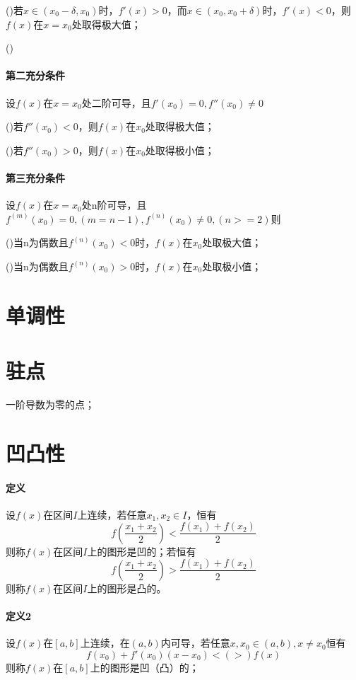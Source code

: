 ()若\(x \in (x_0 - \delta, x_0)\)时，\(f'(x) > 0\)，而\(x \in (x_0, x_0 + \delta)\)时，\(f'(x) < 0\)，则\(f(x)\)在\(x = x_0\)处取得极大值；

()

\paragraph{第二充分条件}
设\(f(x)\)在\(x = x_0\)处二阶可导，且\(f'(x_0) = 0, f''(x_0) \neq 0\)

()若\(f''(x_0) < 0\)，则\(f(x)\)在\(x_0\)处取得极大值；

()若\(f''(x_0) > 0\)，则\(f(x)\)在\(x_0\)处取得极小值；

\paragraph{第三充分条件}
设\(f(x)\)在\(x = x_0\)处n阶可导，且\(f^{(m)}(x_0) = 0, (m = n - 1), f^{(n)}(x_0) \neq 0, (n >= 2)\)则

()当n为偶数且\(f^{(n)}(x_0) < 0\)时，\(f(x)\)在\(x_0\)处取极大值；

()当n为偶数且\(f^{(n)}(x_0) > 0\)时，\(f(x)\)在\(x_0\)处取极小值；


\section{单调性}

\section{驻点}
一阶导数为零的点；


\section{凹凸性}
\paragraph{定义}
设\(f(x)\)在区间\(I\)上连续，若任意\(x_1, x_2 \in I\)，恒有\[f(\dfrac{x_1 + x_2}{2}) < \dfrac{f(x_1) + f(x_2)}{2}\]则称\(f(x)\)在区间\(I\)上的图形是凹的；若恒有
\[f(\dfrac{x_1 + x_2}{2}) > \dfrac{f(x_1) + f(x_2)}{2}\]
则称\(f(x)\)在区间\(I\)上的图形是凸的。

\paragraph{定义2}
设\(f(x)\)在\([a, b]\)上连续，在\((a, b)\)内可导，若任意\(x, x_0 \in (a, b), x \neq x_0\)恒有\[f(x_0) + f'(x_0)(x - x_0) <(>) f(x)\]则称\(f(x)\)在\([a, b]\)上的图形是凹（凸）的；

